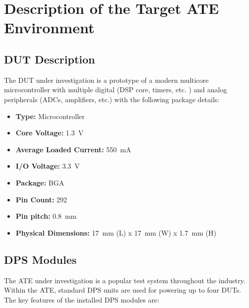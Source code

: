 


\section{Description of the Target \ac{ATE} Environment}
\label{sec:case-study-target-desc}

\subsection{\acs{DUT} Description}
\label{subsec:dut_description}

The \ac{DUT} under investigation is a prototype of a
modern multicore microcontroller with multiple digital (\ac{DSP} core,
timers, etc. ) and analog peripherals (\acp{ADC}, amplifiers, etc.) with the
following package details:

\begin{itemize}[topsep=8pt,itemsep=4pt,partopsep=4pt, parsep=4pt]

    \item \textbf{Type:} Microcontroller
    \item \textbf{Core Voltage:} \SI{1.3}{\volt}
    \item \textbf{Average Loaded Current:} \SI{550}{\milli\ampere}
    \item \textbf{\ac{I/O} Voltage:} \SI{3.3}{\volt}
    \item \textbf{Package:} \ac{BGA}
    \item \textbf{Pin Count:} 292
    \item \textbf{Pin pitch:} \SI{0.8}{\milli\meter}
    \item \textbf{Physical Dimensions:} \SI{17}{\milli\meter} (L) x \SI{17}{\milli\meter} (W) x \SI{1.7}{\milli\meter} (H)

\end{itemize}

\subsection{\acs{DPS} Modules}
\label{ate-and-dps_description}

The \ac{ATE} under investigation is a popular test system throughout
the industry.
Within the \ac{ATE}, standard \ac{DPS} units are used for powering
up to four \acs{DUT}s.
The key features of the installed \ac{DPS} modules are:

